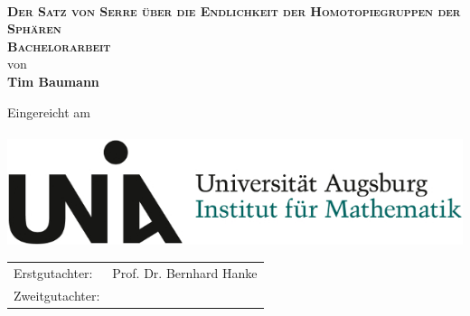 
\begin{titlepage}
  \begin{center}
    \ \vspace{0.1cm}\\
    \Huge \textbf{\textsc{Der Satz von Serre über die Endlichkeit der Homotopiegruppen der Sphären}} \vspace{0.2cm}\\
    \vspace{2cm}
    \LARGE \textbf{\textsc{Bachelorarbeit}}\\
    von\\
    \textbf{Tim Baumann}\\
    \vspace{1.1cm}
    \begin{figure}[htb]
      \centering
    \end{figure}
    \vspace{1.1cm}
    \large Eingereicht am \\
     \\[1cm]
    \includegraphics[scale=0.4]{uni_aux_logo.jpg} \\[1cm]
    \vspace{1.2cm}
    \large \begin{tabular}{ll}
      Erstgutachter: & Prof. Dr. Bernhard Hanke \\
      Zweitgutachter: & \TODO{???}
    \end{tabular}
  \end{center}
\end{titlepage}

